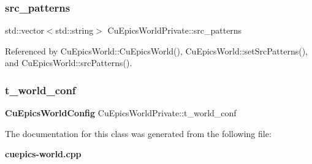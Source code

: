 \mbox{\label{classCuEpicsWorldPrivate_a3255e571eec96319ba251ce3207b9e60}} 
\subsubsection{src\+\_\+patterns}
{\footnotesize\ttfamily std\+::vector$<$std\+::string$>$ Cu\+Epics\+World\+Private\+::src\+\_\+patterns}



Referenced by Cu\+Epics\+World\+::\+Cu\+Epics\+World(), Cu\+Epics\+World\+::set\+Src\+Patterns(), and Cu\+Epics\+World\+::src\+Patterns().

\mbox{\label{classCuEpicsWorldPrivate_a4605a4b63eb708e188c97366e076e87f}} 
\subsubsection{t\+\_\+world\+\_\+conf}
{\footnotesize\ttfamily \textbf{ Cu\+Epics\+World\+Config} Cu\+Epics\+World\+Private\+::t\+\_\+world\+\_\+conf}



The documentation for this class was generated from the following file\+:\begin{DoxyCompactItemize}
\item 
\textbf{ cuepics-\/world.\+cpp}\end{DoxyCompactItemize}
